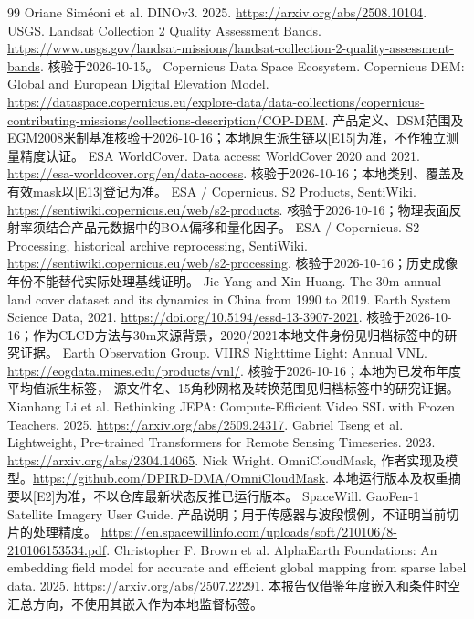 \documentclass[UTF8,fontset=fandol,zihao=5,a4paper]{ctexart}
\begin{document}
\begin{thebibliography}{99}
 Oriane Sim\'eoni et al. DINOv3. 2025. \url{https://arxiv.org/abs/2508.10104}.
 USGS. Landsat Collection 2 Quality Assessment Bands. \url{https://www.usgs.gov/landsat-missions/landsat-collection-2-quality-assessment-bands}. 核验于2026-10-15。
 Copernicus Data Space Ecosystem. Copernicus DEM: Global and European Digital Elevation Model.
\url{https://dataspace.copernicus.eu/explore-data/data-collections/copernicus-contributing-missions/collections-description/COP-DEM}.
产品定义、DSM范围及EGM2008米制基准核验于2026-10-16；本地原生派生链以[E15]为准，不作独立测量精度认证。
 ESA WorldCover. Data access: WorldCover 2020 and 2021.
\url{https://esa-worldcover.org/en/data-access}. 核验于2026-10-16；本地类别、覆盖及有效mask以[E13]登记为准。
 ESA / Copernicus. S2 Products, SentiWiki.
\url{https://sentiwiki.copernicus.eu/web/s2-products}. 核验于2026-10-16；物理表面反射率须结合产品元数据中的BOA偏移和量化因子。
 ESA / Copernicus. S2 Processing, historical archive reprocessing, SentiWiki.
\url{https://sentiwiki.copernicus.eu/web/s2-processing}. 核验于2026-10-16；历史成像年份不能替代实际处理基线证明。
 Jie Yang and Xin Huang. The 30m annual land cover dataset and its dynamics in China from 1990 to 2019.
Earth System Science Data, 2021. \url{https://doi.org/10.5194/essd-13-3907-2021}.
核验于2026-10-16；作为CLCD方法与30m来源背景，2020/2021本地文件身份见归档标签中的研究证据。
 Earth Observation Group. VIIRS Nighttime Light: Annual VNL.
\url{https://eogdata.mines.edu/products/vnl/}. 核验于2026-10-16；本地为已发布年度平均值派生标签，
源文件名、15角秒网格及转换范围见归档标签中的研究证据。
 Xianhang Li et al. Rethinking JEPA: Compute-Efficient Video SSL with Frozen Teachers. 2025. \url{https://arxiv.org/abs/2509.24317}.
 Gabriel Tseng et al. Lightweight, Pre-trained Transformers for Remote Sensing Timeseries. 2023. \url{https://arxiv.org/abs/2304.14065}.
 Nick Wright. OmniCloudMask, 作者实现及模型。\url{https://github.com/DPIRD-DMA/OmniCloudMask}. 本地运行版本及权重摘要以[E2]为准，不以仓库最新状态反推已运行版本。
 SpaceWill. GaoFen-1 Satellite Imagery User Guide. 产品说明；用于传感器与波段惯例，不证明当前切片的处理精度。 \url{https://en.spacewillinfo.com/uploads/soft/210106/8-210106153534.pdf}.
 Christopher F. Brown et al. AlphaEarth Foundations: An embedding field model for accurate and efficient global mapping from sparse label data. 2025. \url{https://arxiv.org/abs/2507.22291}. 本报告仅借鉴年度嵌入和条件时空汇总方向，不使用其嵌入作为本地监督标签。


\end{thebibliography}
\end{document}
